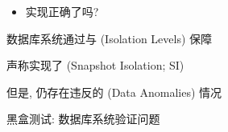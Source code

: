 
\begin{frame}{}
  \begin{itemize}
    \centering
    \item {}实现正确了吗?
  \end{itemize}

  \begin{center}
  \end{center}

	\begin{center}
		数据库系统通过与 (Isolation Levels) 保障
	\end{center}
\end{frame}

\begin{frame}{}
	\begin{center}
		声称实现了 (Snapshot Isolation; SI)

	\end{center}
\end{frame}

\begin{frame}{}
	\begin{center}
		但是, 仍存在违反的 (Data Anomalies) 情况

	\end{center}
\end{frame}

\begin{frame}{}
	\begin{center}
		{\Large 黑盒测试: 数据库系统验证问题}

	\end{center}
\end{frame}

